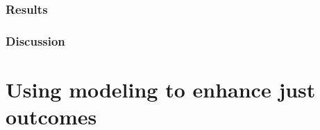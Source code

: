 \subsection{Results}

\subsection{Discussion}








\chapter{Using modeling to enhance just outcomes}
\label{chapter:communities}



